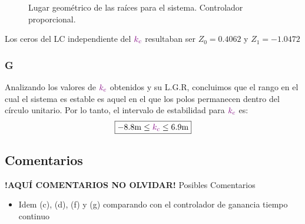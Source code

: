 \begin{figure}[ht]
    \centering
    
    \caption{Lugar geométrico de las raíces para el sistema. Controlador proporcional.}
    \label{fig:lgr-i2}
\end{figure}

Los ceros del LC independiente del \(\mathbin{\color{violet}k_c}\) resultaban ser $Z_{0} = 0.4062 $ y $Z_{1} = -1.0472$ 


\FloatBarrier
\subsubsection{G}%

Analizando los valores de \(\mathbin{\color{violet}k_c}\) obtenidos y su L.G.R, concluimos que el rango en el cual el sistema es estable es aquel en el que los polos permanecen dentro del círculo unitario. Por lo tanto, el intervalo de estabilidad para \(\mathbin{\color{violet}k_c}\) es:
\begin{equation}
  \boxed{ -8.8\unit{m} \leq \mora{k_{c}} \leq 6.9\unit{m} }
\end{equation}

\FloatBarrier
\subsection{Comentarios}


\textbf{!AQUÍ COMENTARIOS NO OLVIDAR!}
Posibles Comentarios
\begin{itemize}
    \item Idem (c), (d), (f) y (g) comparando con el controlador de ganancia tiempo continuo
\end{itemize}
